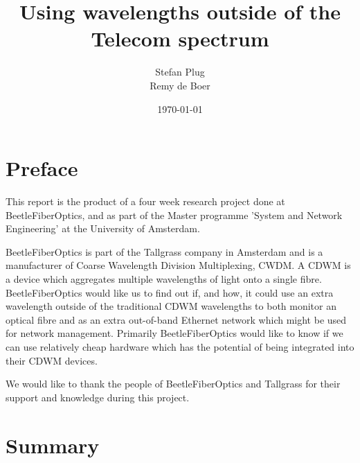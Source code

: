 \documentclass{article}
\begin{document}
\title{Using wavelengths outside of the Telecom spectrum}
\author{Stefan Plug\\Remy de Boer}
\date{\today}
\maketitle

\tableofcontents
\newpage

\section{Preface}
This report is the product of a four week research project done at BeetleFiberOptics, and as part of the Master programme 'System and Network Engineering' at the University of Amsterdam\cite{uva:os3}.

BeetleFiberOptics is part of the Tallgrass company in Amsterdam and is a manufacturer of Coarse Wavelength Division Multiplexing, CWDM. A CDWM is a device which aggregates multiple wavelengths of light onto a single fibre. BeetleFiberOptics would like us to find out if, and how, it could use an extra wavelength outside of the traditional CDWM wavelengths to both monitor an optical fibre and as an extra out-of-band Ethernet network which might be used for network management. Primarily BeetleFiberOptics would like to know if we can use relatively cheap hardware which has the potential of being integrated into their CDWM devices.

We would like to thank the people of BeetleFiberOptics and Tallgrass for their support and knowledge during this project.

\newpage
\section{Summary}
\newpage
\end{document}
